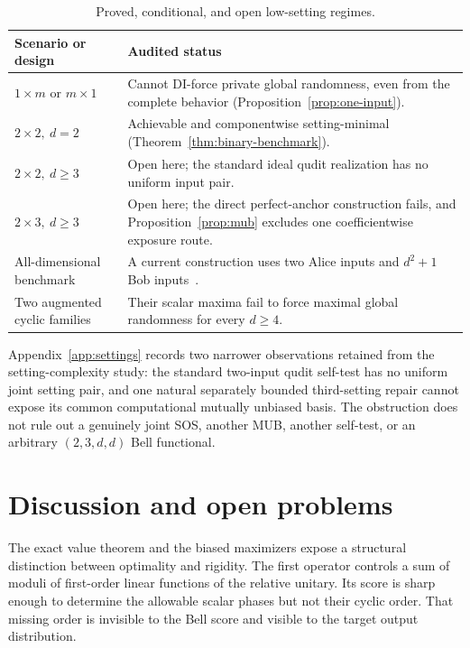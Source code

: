 \documentclass[11pt]{article}
\theoremstyle{definition}
\theoremstyle{remark}
\begin{document}
\begin{table}[t]
\centering
\small
\begin{tabularx}{\textwidth}{@{}>{\raggedright\arraybackslash}p{}X@{}}
\toprule
Scenario or design & Audited status\\
\midrule
\(1\times m\) or \(m\times1\) & Cannot DI-force private global randomness,
even from the complete behavior (Proposition~\ref{prop:one-input}).\\
\(2\times2,\ d=2\) & Achievable and componentwise setting-minimal
(Theorem~\ref{thm:binary-benchmark}).\\
\(2\times2,\ d\geq3\) & Open here; the standard ideal qudit realization has
no uniform input pair.\\
\(2\times3,\ d\geq3\) & Open here; the direct perfect-anchor construction
fails, and Proposition~\ref{prop:mub} excludes one coefficientwise exposure
route.\\
All-dimensional benchmark & A current construction uses two Alice inputs and
\(d^2+1\) Bob inputs~\cite{FarkasMironowiczAugusiak2026}.\\
Two augmented cyclic families & Their scalar maxima fail to force maximal
global randomness for every \(d\geq4\).\\
\bottomrule
\end{tabularx}
\caption{Proved, conditional, and open low-setting regimes.}
\label{tab:setting-status}
\end{table}

Appendix~\ref{app:settings} records two narrower observations retained from
the setting-complexity study: the standard two-input qudit self-test has no
uniform joint setting pair, and one natural separately bounded third-setting
repair cannot expose its common computational mutually unbiased basis.  The
obstruction does not rule out a genuinely joint SOS, another MUB, another
self-test, or an arbitrary \((2,3,d,d)\) Bell functional.

\section{Discussion and open problems}

The exact value theorem and the biased maximizers expose a structural
distinction between optimality and rigidity.  The first operator controls a
sum of moduli of first-order linear functions of the relative unitary.  Its
score is sharp enough to determine the allowable scalar phases but not their
cyclic order.  That missing order is invisible to the Bell score and visible
to the target output distribution.
\end{document}
